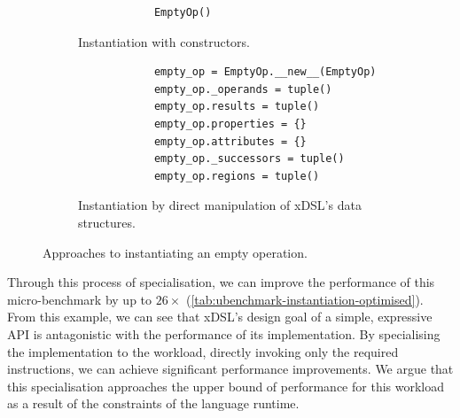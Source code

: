 \begin{figure}[H]
    \begin{subfigure}[b]{0.5\textwidth}
       \centering
        \begin{verbatim}
            EmptyOp()
        \end{verbatim}
        \footnotesize\vspace{3.5em}
        \caption{Instantiation with constructors.}
        \label{listing:ubenchmark-xdsl-constant-constructor}
    \end{subfigure}
    \hfill
    \begin{subfigure}[b]{0.5\textwidth}
        \centering
        \begin{verbatim}
            empty_op = EmptyOp.__new__(EmptyOp)
            empty_op._operands = tuple()
            empty_op.results = tuple()
            empty_op.properties = {}
            empty_op.attributes = {}
            empty_op._successors = tuple()
            empty_op.regions = tuple()
        \end{verbatim}
        \caption{Instantiation by direct manipulation of xDSL's data structures.}
        \label{listing:ubenchmark-xdsl-constant-direct}
    \end{subfigure}
    \captionsetup{name=Listing}
    \caption{Approaches to instantiating an empty operation.}
    \label{listing:ubenchmark-xdsl-constant}
\end{figure}

Through this process of specialisation, we can improve the performance of this micro-benchmark by up to $26\times$ (\autoref{tab:ubenchmark-instantiation-optimised}).
From this example, we can see that xDSL's design goal of a simple, expressive API is antagonistic with the performance of its implementation. By specialising the implementation to the workload, directly invoking only the required instructions, we can achieve significant performance improvements. We argue that this specialisation approaches the upper bound of performance for this workload as a result of the constraints of the language runtime.

